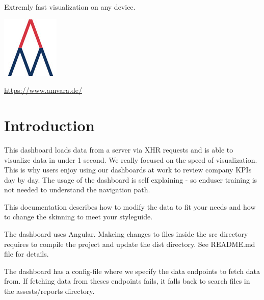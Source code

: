 \documentclass[11pt]{article}
\begin{document}
 
\maketitle %
\thispagestyle{empty}

\begin{centering} %
	Extremly fast visualization on any device.
	\bigskip
	\par
	\bigskip
	\bigskip
	\bigskip
	\bigskip
	\bigskip
	\bigskip
	\bigskip
	\bigskip
	\bigskip
	\bigskip	
	\bigskip
	\bigskip
	\bigskip
	\bigskip
	\bigskip
	\bigskip
	\bigskip
	\bigskip
	\bigskip
	\bigskip
	\includegraphics{amvara} \par
	\bigskip
	\url{https://www.amvara.de/} \par
	\bigskip
	\bigskip
	\date{\today}\par %
\end{centering}

\newpage %
\tableofcontents %
\thispagestyle{empty}
\newpage



\section{Introduction} %
This dashboard loads data from a server via XHR requests and is able to visualize data in under 1 second. We really focused on the speed of visualization. This is why users enjoy using our dashboards at work to review company KPIs day by day. The usage of the dashboard is self explaining - so enduser training is not needed to understand the navigation path. 
\bigskip

This documentation describes how to modify the data to fit your needs and how to change the skinning to meet your styleguide.
\bigskip

The dashboard uses Angular. Makeing changes to files inside the src directory requires to compile the project and update the dist directory. See README.md file for details.
\bigskip

The dashboard has a config-file where we specify the data endpoints to fetch data from. If fetching data from theses endpoints fails, it falls back to search files in the assests/reports directory. 
\bigskip
\end{document}
